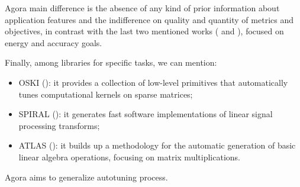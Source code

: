 Agora main difference is the absence of any kind of prior information about application features and the indifference on quality and quantity of metrics and objectives, in contrast with the last two mentioned works (\cite{baek2010green} and \cite{hoffmann2011dynamic}), focused on energy and accuracy goals.

Finally, among libraries for specific tasks, we can mention:

\begin{itemize}

	\item OSKI (\cite{vuduc2005oski}): it provides a collection of low-level primitives that automatically tunes computational kernels on sparse matrices;

	\item SPIRAL (\cite{puschel2004spiral}): it generates fast software implementations of linear signal processing transforms;

	\item ATLAS (\cite{whaley1998automatically}): it builds up a methodology for the automatic generation of basic linear algebra operations, focusing on matrix multiplications.

\end{itemize}

Agora aims to generalize autotuning process.
